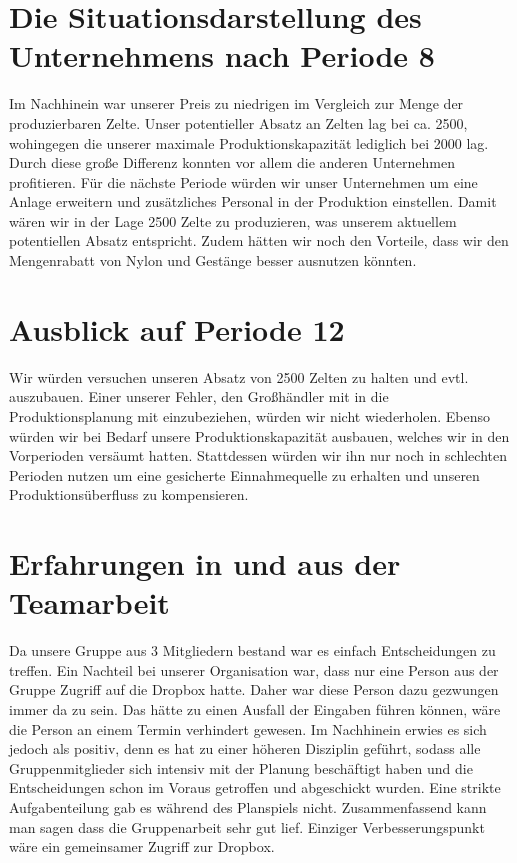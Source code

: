\documentclass[a4paper, 12pt]{report}
\begin{document}
\begin{flushleft}
\chapter{Die Situationsdarstellung des Unternehmens nach Periode 8}  
Im Nachhinein war unserer Preis zu niedrigen im Vergleich zur Menge der produzierbaren Zelte.
Unser potentieller Absatz an Zelten lag bei ca. 2500, wohingegen die unserer maximale Produktionskapazität lediglich bei 2000 lag.
Durch diese große Differenz konnten vor allem die anderen Unternehmen profitieren.
Für die nächste Periode würden wir unser Unternehmen um eine Anlage erweitern und zusätzliches Personal in der Produktion einstellen.
Damit wären wir in der Lage 2500 Zelte zu produzieren, was unserem aktuellem potentiellen Absatz entspricht.
Zudem hätten wir noch den Vorteile, dass wir den Mengenrabatt von Nylon und Gestänge besser ausnutzen könnten.

\chapter{Ausblick auf Periode 12}
Wir würden versuchen unseren Absatz von 2500 Zelten zu halten und evtl. auszubauen.
Einer unserer Fehler, den Großhändler mit in die Produktionsplanung mit einzubeziehen, würden wir nicht wiederholen.
Ebenso würden wir bei Bedarf unsere Produktionskapazität ausbauen, welches wir in den Vorperioden versäumt hatten.
Stattdessen würden wir ihn nur noch in schlechten Perioden nutzen um eine gesicherte Einnahmequelle zu erhalten und unseren Produktionsüberfluss zu kompensieren.


\chapter{Erfahrungen in und aus der Teamarbeit}
Da unsere Gruppe aus 3 Mitgliedern bestand war es einfach Entscheidungen zu treffen.
Ein Nachteil bei unserer Organisation war, dass nur eine Person aus der Gruppe Zugriff auf die Dropbox hatte.
Daher war diese Person dazu gezwungen immer da zu sein.
Das hätte zu einen Ausfall der Eingaben führen können, wäre die Person an einem Termin verhindert gewesen.
Im Nachhinein erwies es sich jedoch als positiv, denn es hat zu einer höheren Disziplin geführt, sodass alle Gruppenmitglieder sich intensiv mit der Planung beschäftigt haben und die Entscheidungen schon im Voraus getroffen und abgeschickt wurden.
Eine strikte Aufgabenteilung gab es während des Planspiels nicht.
Zusammenfassend kann man sagen dass die Gruppenarbeit sehr gut lief.
Einziger Verbesserungspunkt wäre ein gemeinsamer Zugriff zur Dropbox. 


\end{flushleft}
\end{document}

